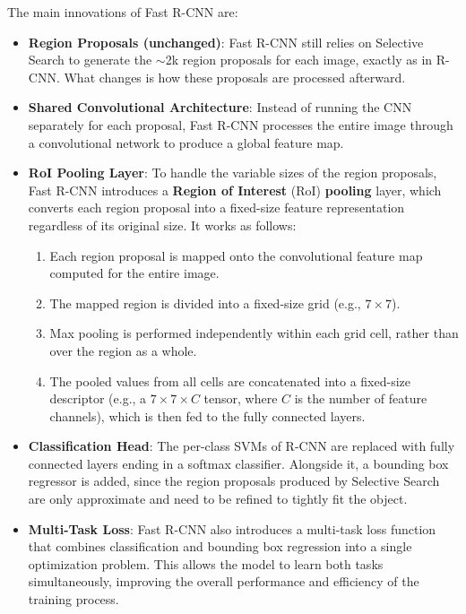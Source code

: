 The main innovations of Fast R-CNN are:
\begin{itemize}
    \item \textbf{Region Proposals (unchanged)}: Fast R-CNN still relies on Selective Search to generate the $\sim$2k region proposals for each image, exactly as in R-CNN.
    What changes is how these proposals are processed afterward.

    \item \textbf{Shared Convolutional Architecture}: Instead of running the CNN separately for each proposal,
    Fast R-CNN processes the entire image through a convolutional network to produce a global feature map. 
    
    \item \textbf{RoI Pooling Layer}: To handle the variable sizes of the region proposals, Fast R-CNN introduces a \textbf{Region of Interest} (RoI) \textbf{pooling} layer,
    which converts each region proposal into a fixed-size feature representation regardless of its original size. It works as follows:
    \begin{enumerate}
        \item Each region proposal is mapped onto the convolutional feature map computed for the entire image.
        \item The mapped region is divided into a fixed-size grid (e.g., $7 \times 7$).
        \item Max pooling is performed independently within each grid cell, rather than over the region as a whole.
        \item The pooled values from all cells are concatenated into a fixed-size descriptor (e.g., a $7 \times 7 \times C$ tensor, where $C$ is the number of feature channels), which is then fed to the fully connected layers.
    \end{enumerate}
    
    \item \textbf{Classification Head}: The per-class SVMs of R-CNN are replaced with fully connected layers ending in a softmax classifier.
    Alongside it, a bounding box regressor is added, since the region proposals produced by Selective Search are only approximate and need to be refined to tightly fit the object.

    \item \textbf{Multi-Task Loss}: Fast R-CNN also introduces a multi-task loss function that combines classification and bounding box regression into a single optimization problem.
    This allows the model to learn both tasks simultaneously, improving the overall performance and efficiency of the training process.
\end{itemize}

